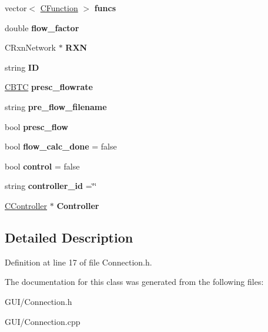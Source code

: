 \begin{DoxyCompactItemize}
vector$<$ \hyperlink{class_c_function}{C\+Function} $>$ {\bfseries funcs}
\item 
\mbox{\label{class_c_connection_a53bfbc0e319eb24704ebcb66892c113d}} 
double {\bfseries flow\+\_\+factor}
\item 
\mbox{\label{class_c_connection_a93065c8cc42141b63f3726f40ef09746}} 
C\+Rxn\+Network $\ast$ {\bfseries R\+XN}
\item 
\mbox{\label{class_c_connection_a0b9504240642627d59ad7de2f1f2ce7f}} 
string {\bfseries ID}
\item 
\mbox{\label{class_c_connection_ad4891a7ce922675f7d54df5550a263ed}} 
\hyperlink{class_c_b_t_c}{C\+B\+TC} {\bfseries presc\+\_\+flowrate}
\item 
\mbox{\label{class_c_connection_aa110607e3da90feb3ac56a985159a8ef}} 
string {\bfseries pre\+\_\+flow\+\_\+filename}
\item 
\mbox{\label{class_c_connection_aaceead16907de034759477c93c2cab23}} 
bool {\bfseries presc\+\_\+flow}
\item 
\mbox{\label{class_c_connection_acc2d35f1ab9312dc1f848c23a6a3095b}} 
bool {\bfseries flow\+\_\+calc\+\_\+done} = false
\item 
\mbox{\label{class_c_connection_a59dee1ba5769b12d64e442ae7848a272}} 
bool {\bfseries control} = false
\item 
\mbox{\label{class_c_connection_a234de8040a2dc44f88fb728bd9d1a73d}} 
string {\bfseries controller\+\_\+id} =\char`\"{}\char`\"{}
\item 
\mbox{\label{class_c_connection_a3f8b0e61b034fbf8d1d09f0bc62b62aa}} 
\hyperlink{class_c_controller}{C\+Controller} $\ast$ {\bfseries Controller}
\end{DoxyCompactItemize}


\subsection{Detailed Description}


Definition at line 17 of file Connection.\+h.



The documentation for this class was generated from the following files\+:\begin{DoxyCompactItemize}
\item 
G\+U\+I/Connection.\+h\item 
G\+U\+I/Connection.\+cpp\end{DoxyCompactItemize}
